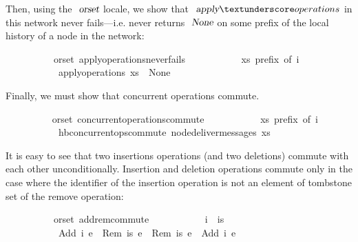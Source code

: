 \noindent Then, using the $\isa{orset}$ locale, we show that
$\isa{apply}{\isacharunderscore}operations$ in this network never fails---i.e.
never returns $\isa{None}$ on some prefix of the local history of a node in the
network:
\vspace{0.375em}
\begin{isabellebody}
\ \ \ \ \ \ \ \ \ {\isacharparenleft}\ orset{\isacharparenright}\ apply{\isacharunderscore}operations{\isacharunderscore}never{\isacharunderscore}fails{\isacharcolon}\isanewline
\ \ \ \ \ \ \ \ \ \ \ {\isachardoublequoteopen}xs\ prefix\ of\ i{\isachardoublequoteclose}\isanewline
\ \ \ \ \ \ \ \ \ \ \ {\isachardoublequoteopen}apply{\isacharunderscore}operations\ xs\ {\isasymnoteq}\ None{\isachardoublequoteclose}
\end{isabellebody}
\vspace{0.375em}
\noindent Finally, we must show that concurrent operations commute.
\vspace{0.375em}
\begin{isabellebody}
\ \ \ \ \ \ \ \  {\isacharparenleft}\ orset{\isacharparenright}\ concurrent{\isacharunderscore}operations{\isacharunderscore}commute{\isacharcolon}\isanewline
\ \ \ \ \ \ \ \ \ \ \ {\isachardoublequoteopen}xs\ prefix\ of\ i{\isachardoublequoteclose}\isanewline
\ \ \ \ \ \ \ \ \ \ \ {\isachardoublequoteopen}hb{\isachardot}concurrent{\isacharunderscore}ops{\isacharunderscore}commute\ {\isacharparenleft}node{\isacharunderscore}deliver{\isacharunderscore}messages\ xs{\isacharparenright}{\isachardoublequoteclose}
\end{isabellebody}
\vspace{0.375em}
\noindent It is easy to see that two insertions operations (and two deletions)
commute with each other unconditionally. Insertion and deletion operations
commute only in the case where the identifier of the insertion operation is not
an element of tombstone set of the remove operation:
\vspace{0.375em}
\begin{isabellebody}
\ \ \ \ \ \ \ \ \ {\isacharparenleft}\ orset{\isacharparenright}\ add{\isacharunderscore}rem{\isacharunderscore}commute{\isacharcolon}\isanewline
\ \ \ \ \ \ \ \ \ \ \ {\isachardoublequoteopen}i\ {\isasymnotin}\ is{\isachardoublequoteclose}\isanewline
\ \ \ \ \ \ \ \ \ \ \ {\isachardoublequoteopen}{\isasymlangle}Add\ i\ e{}{\isasymrangle}\ {\isasymrhd}\ {\isasymlangle}Rem\ is\ e{}{\isasymrangle}\ {\isacharequal}\ {\isasymlangle}Rem\ is\ e{}{\isasymrangle}\ {\isasymrhd}\ {\isasymlangle}Add\ i\ e{}{\isasymrangle}{\isachardoublequoteclose}
\end{isabellebody}
\vspace{0.375em}


